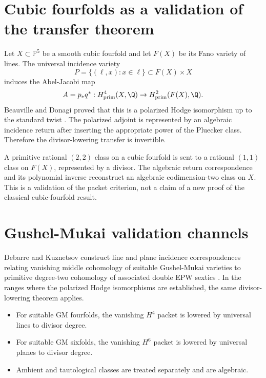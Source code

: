 \chapter{Cubic fourfolds as a validation of the transfer theorem}
Let $X\subset\mathbb P^5$ be a smooth cubic fourfold and let $F(X)$ be its Fano variety of lines. The universal incidence variety
\[
P=\{(\ell,x):x\in\ell\}\subset F(X)\times X
\]
induces the Abel-Jacobi map
\[
A=p_*q^*:H^4_{\mathrm{prim}}(X,\Q)\to H^2_{\mathrm{prim}}(F(X),\Q).
\]
Beauville and Donagi proved that this is a polarized Hodge isomorphism up to the standard twist \cite{BeauvilleDonagi}. The polarized adjoint is represented by an algebraic incidence return after inserting the appropriate power of the Pluecker class. Therefore the divisor-lowering transfer is invertible.

\begin{resultbox}
A primitive rational $(2,2)$ class on a cubic fourfold is sent to a rational $(1,1)$ class on $F(X)$, represented by a divisor. The algebraic return correspondence and its polynomial inverse reconstruct an algebraic codimension-two class on $X$. This is a validation of the packet criterion, not a claim of a new proof of the classical cubic-fourfold result.
\end{resultbox}





\chapter{Gushel-Mukai validation channels}
Debarre and Kuznetsov construct line and plane incidence correspondences relating vanishing middle cohomology of suitable Gushel-Mukai varieties to primitive degree-two cohomology of associated double EPW sextics \cite{DebarreKuznetsov}. In the ranges where the polarized Hodge isomorphisms are established, the same divisor-lowering theorem applies.

\begin{itemize}
\item For suitable GM fourfolds, the vanishing $H^4$ packet is lowered by universal lines to divisor degree.
\item For suitable GM sixfolds, the vanishing $H^6$ packet is lowered by universal planes to divisor degree.
\item Ambient and tautological classes are treated separately and are algebraic.
\end{itemize}



